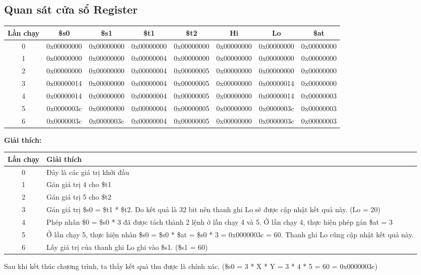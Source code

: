 \documentclass[12pt,a4paper,oneside]{article}
\begin{document}
	\subsection{Quan sát cửa sổ Register}
	\begin{center}
	\begin{small}
	 \begin{tabular}{|c|c|c|c|c|c|c|c|}
	\hline 
	Lần chạy & \$s0 & \$s1 & \$t1 & \$t2 & Hi & Lo & \$at \\ 
	\hline 
	0 & 0x00000000 & 0x00000000 & 0x00000000 & 0x00000000 & 0x00000000 & 0x00000000 & 0x00000000 \\ 
	\hline 
	1 & 0x00000000 & 0x00000000 & 0x00000004 & 0x00000000 & 0x00000000 & 0x00000000 & 0x00000000 \\ 
	\hline 
	2 & 0x00000000 & 0x00000000 & 0x00000004 & 0x00000005 & 0x00000000 & 0x00000000 & 0x00000000 \\ 
	\hline 
	3 & 0x00000014 & 0x00000000 & 0x00000004 & 0x00000005 & 0x00000000 & 0x00000014 & 0x00000000 \\ 
	\hline 
	4 & 0x00000014 & 0x00000000 & 0x00000004 & 0x00000005 & 0x00000000 & 0x00000014 & 0x00000003 \\ 
	\hline 
	5 & 0x0000003c & 0x00000000 & 0x00000004 & 0x00000005 & 0x00000000 & 0x0000003c & 0x00000003 \\ 
	\hline 
	6 & 0x0000003c & 0x0000003c & 0x00000004 & 0x00000005 & 0x00000000 & 0x0000003c & 0x00000003 \\ 
	\hline 
	\end{tabular}
	 \end{small} 
	\end{center}
	\textbf{Giải thích:\\}
	\begin{center}
	\begin{tabular}{|c|>{\raggedright\arraybackslash}p{11cm}|}
	\hline 
	Lần chạy & Giải thích \\ 
	\hline 
	0 & Đây là các giá trị khởi đầu \\ 
	\hline 
	1 & Gán giá trị 4 cho \$t1 \\
	\hline 
	2 & Gán giá trị 5 cho \$t2 \\ 
	\hline 
	3 & Gán giá trị \$s0 = \$t1 * \$t2. Do kết quả là 32 bit nên thanh ghi Lo sẽ được cập nhật kết quả này. (Lo = 20) \\ 
	\hline 
	4 & Phép nhân \$0 = \$s0 * 3 đã được tách thành 2 lệnh ở lần chạy 4 và 5. Ở lần chạy 4, thực hiện phép gán \$at = 3  \\ 
	\hline 
	5 & Ở lần chạy 5, thực hiện nhân \$s0 = \$s0 * \$at = \$s0 * 3 \linebreak = 0x0000003c = 60. Thanh ghi Lo cũng cập nhật kết quả này. \\ 
	\hline 
	6 & Lấy giá trị của thanh ghi Lo ghi vào \$s1. (\$s1 = 60) \\ 
	\hline 
	\end{tabular} 
	\end{center}
	Sau khi kết thúc chương trình, ta thấy kết quả thu được là chính xác. (\$s0 = 3 * X * Y \linebreak  = 3 * 4 * 5 = 60 = 0x0000003c)
\end{document}
